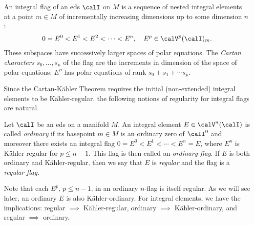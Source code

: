 \begin{defn}
    An integral flag of an \gls{eds} $\calI$ on $M$ is a sequence of nested integral elements at a point $m\in M$ of incrementally increasing dimensions up to some dimension $n$:
    \[0=E^0< E^1< E^2< \cdots< E^n,\quad E^p\in\calV^p(\calI)_m.\]
    These subspaces have successively larger spaces of polar equations. The \emph{Cartan characters} $s_0,\ldots,s_n$ of the flag are the increments in dimension of the space of polar equations: $E^p$ has polar equations of rank $s_0+s_1+\cdots s_p$.
\end{defn}

Since the Cartan-K\"ahler Theorem requires the initial (non-extended) integral elements to be K\"ahler-regular, the following notions of regularity for integral flags are natural.

\begin{defn}
    Let $\calI$ be an \gls{eds} on a manifold $M$. An integral element $E\in\calV^n(\calI)$ is called \emph{ordinary} if its basepoint $m\in M$ is an ordinary zero of $\calI^0$ and moreover there exists an integral flag $0=E^0<E^1<\cdots <E^n=E$, where $E^n$ is K\"ahler-regular for $p\leq n-1$. This flag is then called an \emph{ordinary flag}. If $E$ is both ordinary and K\"ahler-regular, then we say that $E$ is \emph{regular} and the flag is a \emph{regular flag}.
\end{defn}

Note that each $E^p$, $p\leq n-1$, in an ordinary $n$-flag is itself regular. As we will see later, an ordinary $E$ is also K\"ahler-ordinary. For integral elements, we have the implications: regular $\implies$ K\"ahler-regular, ordinary $\implies$ K\"ahler-ordinary, and regular $\implies$ ordinary. 


